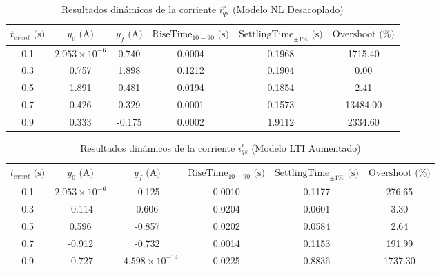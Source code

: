 \documentclass[blue,fullpaper]{ludusofficial}  %
\begin{document}
\FloatBarrier
\begin{table}[htbp]
\centering
\caption{Resultados dinámicos de la corriente $i_{qs}^r$ (Modelo NL Desacoplado)}
\begin{tabular}{|c|c|c|c|c|c|}
\hline
$t_{event}\text{ (s)}$ & $y_0\text{ (A)}$ & $y_f\text{ (A)}$ & $\text{RiseTime}_{10-90}\text{ (s)}$ & $\text{SettlingTime}_{\pm 1\%}\text{ (s)}$ & $\text{Overshoot (\%)} $ \\
\hline
0.1 & $2.053 \times 10^{-6}$ & 0.740  & 0.0004 & 0.1968 & 1715.40  \\
\hline
0.3 & 0.757                 & 1.898  & 0.1212 & 0.1904 & 0.00     \\
\hline
0.5 & 1.891                 & 0.481  & 0.0194 & 0.1854 & 2.41     \\
\hline
0.7 & 0.426                 & 0.329  & 0.0001 & 0.1573 & 13484.00 \\
\hline
0.9 & 0.333                 & -0.175 & 0.0002 & 1.9112 & 2334.60  \\
\hline
\end{tabular}
\label{tab:dinamica_iqs_NL}
\end{table}
\FloatBarrier
\begin{table}[htbp]
\centering
\caption{Resultados dinámicos de la corriente $i_{qs}^r$ (Modelo LTI Aumentado)}
\begin{tabular}{|c|c|c|c|c|c|}
\hline
$t_{event}\text{ (s)}$ & $y_0\text{ (A)}$ & $y_f\text{ (A)}$ & $\text{RiseTime}_{10-90}\text{ (s)}$ & $\text{SettlingTime}_{\pm 1\%}\text{ (s)}$ & $\text{Overshoot (\%)} $ \\
\hline
0.1 & $2.053 \times 10^{-6}$ & -0.125                  & 0.0010 & 0.1177 & 276.65  \\
\hline
0.3 & -0.114                 & 0.606                   & 0.0204 & 0.0601 & 3.30    \\
\hline
0.5 & 0.596                  & -0.857                  & 0.0202 & 0.0584 & 2.64    \\
\hline
0.7 & -0.912                 & -0.732                  & 0.0014 & 0.1153 & 191.99  \\
\hline
0.9 & -0.727                 & $-4.598 \times 10^{-14}$ & 0.0225 & 0.8836 & 1737.30 \\
\hline
\end{tabular}
\label{tab:dinamica_iqs_LTI}
\end{table}
\FloatBarrier
\clearpage
\end{document}
